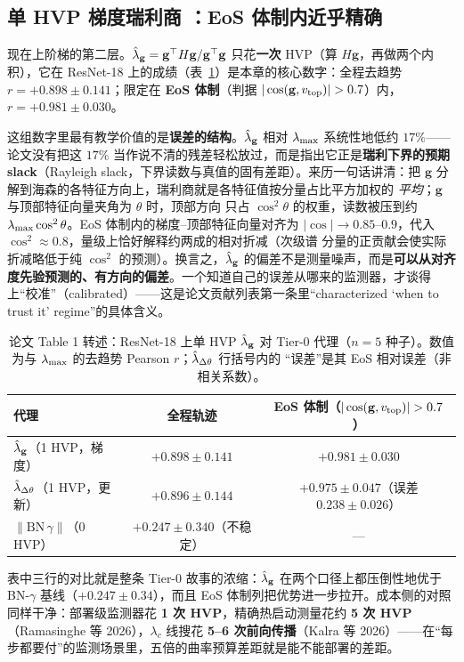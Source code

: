\subsection{单 HVP 梯度瑞利商 \lhatg：EoS 体制内近乎精确}
\label{sec:ch04-rayleigh}

现在上阶梯的第二层。$\hat{\lambda}_{\mathbf{g}}=\mathbf{g}^{\top}H\mathbf{g}/\mathbf{g}^{\top}\mathbf{g}$
只花\textbf{一次} HVP（算 $H\mathbf{g}$，再做两个内积），它在 ResNet-18
上的成绩（表~\ref{tab:ch04-proxy}）是本章的核心数字：全程去趋势
$r=+0.898\pm0.141$；限定在 \textbf{EoS 体制}（判据
$|\cos(\mathbf{g},\vtope)|>0.7$）内，$r=+0.981\pm0.030$。

这组数字里最有教学价值的是\textbf{误差的结构}。$\hat{\lambda}_{\mathbf{g}}$ 相对 $\lambda_{\max}$
系统性地低约 $17\%$——论文没有把这 $17\%$
当作说不清的残差轻松放过，而是指出它正是\textbf{瑞利下界的预期 slack}（Rayleigh
slack，下界读数与真值的固有差距）。来历一句话讲清：把 $\mathbf{g}$
分解到海森的各特征方向上，瑞利商就是各特征值按分量占比平方加权的
\emph{平均}；$\mathbf{g}$ 与顶部特征向量夹角为 $\theta$ 时，顶部方向
只占 $\cos^{2}\theta$ 的权重，读数被压到约 $\lambda_{\max}\cos^{2}\theta$。EoS
体制内的梯度--顶部特征向量对齐为 $|\cos|\!\to\!0.85$--$0.9$，代入
$\cos^{2}\!\approx\!0.8$，量级上恰好解释约两成的相对折减（次级谱
分量的正贡献会使实际折减略低于纯 $\cos^{2}$ 的预测）。换言之，$\hat{\lambda}_{\mathbf{g}}$
的偏差不是测量噪声，而是\textbf{可以从对齐度先验预测的、有方向的偏差}。一个知道自己的误差从哪来的监测器，才谈得上“校准”（calibrated）——这是论文贡献列表第一条里“characterized
`when to trust it' regime”的具体含义。

\begin{table}[!ht]
\centering\small
\caption{论文 Table 1 转述：ResNet-18 上单 HVP $\hat{\lambda}_{\mathbf{g}}$ 对 Tier-0 代理（$n=5$
种子）。数值为与 $\lambda_{\max}$ 的去趋势 Pearson $r$；$\hat{\lambda}_{\Delta\theta}$ 行括号内的
``误差''是其 EoS 相对误差（非相关系数）。}
\label{tab:ch04-proxy}
\begin{tabular}{lcc}
\toprule
代理 & 全程轨迹 & EoS 体制（$|\cos(\mathbf{g},\vtope)|>0.7$） \\
\midrule
$\hat{\lambda}_{\mathbf{g}}$（1 HVP，梯度） & $\mathbf{+0.898\pm0.141}$ & $\mathbf{+0.981\pm0.030}$ \\
$\hat{\lambda}_{\Delta\theta}$（1 HVP，更新） & $+0.896\pm0.144$ & $+0.975\pm0.047$（误差 $0.238\pm0.026$） \\
$\|\mathrm{BN}\,\gamma\|$（0 HVP） & $+0.247\pm0.340$（不稳定） & --- \\
\bottomrule
\end{tabular}
\end{table}

表中三行的对比就是整条 Tier-0 故事的浓缩：$\hat{\lambda}_{\mathbf{g}}$ 在两个口径上都压倒性地优于
BN-$\gamma$ 基线（$+0.247\pm0.34$），而且 EoS
体制列把优势进一步拉开。成本侧的对照同样干净：部署级监测器花 \textbf{1 次
HVP}，精确热启动测量花约 \textbf{5 次 HVP}（Ramasinghe 等 2026），$\lambda_c$
线搜花 \textbf{5--6 次前向传播}（Kalra 等
2026）——在“每步都要付”的监测场景里，五倍的曲率预算差距就是能不能部署的差距。


